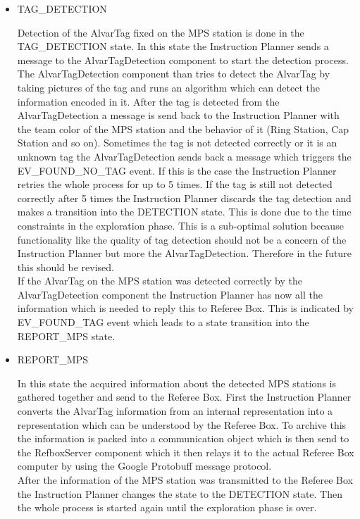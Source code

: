 \begin{itemize}
\item TAG\_DETECTION

Detection of the AlvarTag fixed on the MPS station is done in the TAG\_DETECTION state. In this state the Instruction Planner sends a message to the AlvarTagDetection component to start the detection process. The AlvarTagDetection component than tries to detect the AlvarTag by taking pictures of the tag and runs an algorithm which can detect the information encoded in it. After the tag is detected from the AlvarTagDetection a message is send back to the Instruction Planner with the team color of the MPS station and the behavior of it (Ring Station, Cap Station and so on). Sometimes the tag is not detected correctly or it is an unknown tag the AlvarTagDetection sends back a message which triggers the EV\_FOUND\_NO\_TAG event. If this is the case the Instruction Planner retries the whole process for up to 5 times. If the tag is still not detected correctly after 5 times the Instruction Planner discards the tag detection and makes a transition into the DETECTION state. This is done due to the time constraints in the exploration phase. This is a sub-optimal solution because functionality like the quality of tag detection should not be a concern of the Instruction Planner but more the AlvarTagDetection. Therefore in the future this should be revised. \\

If the AlvarTag on the MPS station was detected correctly by the AlvarTagDetection component the Instruction Planner has now all the information which is needed to reply this to Referee Box. This is indicated by EV\_FOUND\_TAG event which leads to a state transition into the REPORT\_MPS state.


\item REPORT\_MPS

In this state the acquired information about the detected MPS stations is gathered together and send to the Referee Box. First the Instruction Planner converts the AlvarTag information from an internal representation into a representation which can be understood by the Referee Box. To archive this the information is packed into a communication object which is then send to the RefboxServer component which it then relays it to the actual Referee Box computer by using the Google Protobuff message protocol.  \\

After the information of the MPS station was transmitted to the Referee Box the Instruction Planner changes the state to the DETECTION state. Then the whole process is started again until the exploration phase is over. 


\end{itemize}


